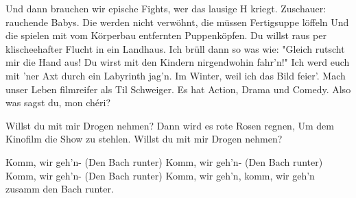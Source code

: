 \begin{guitar}
	 
	
	Und dann brauchen wir epische Fights, wer das lausige H kriegt.
	Zuschauer: rauchende Babys.
	Die werden nicht verwöhnt, die müssen Fertigsuppe löffeln
	Und die spielen mit vom Körperbau entfernten Puppenköpfen.
	Du willst raus per klischeehafter Flucht in ein Landhaus.
	Ich brüll dann so was wie: "Gleich rutscht mir die Hand aus!
	Du wirst mit den Kindern nirgendwohin fahr'n!"
	Ich werd euch mit 'ner Axt durch ein Labyrinth jag’n.
	Im Winter, weil ich das Bild feier'.
	Mach unser Leben filmreifer als Til Schweiger.
	Es hat Action, Drama und Comedy.
	Also was sagst du, mon chéri?
	
	Willst du mit mir Drogen nehmen?
	Dann wird es rote Rosen regnen,
	Um dem Kinofilm die Show zu stehlen.
	Willst du mit mir Drogen nehmen?
	
	 
	
	Komm, wir geh'n- (Den Bach runter)
	Komm, wir geh'n- (Den Bach runter)
	Komm, wir geh'n- (Den Bach runter)
	Komm, wir geh'n, komm, wir geh'n zusamm den Bach runter.
\end{guitar}

